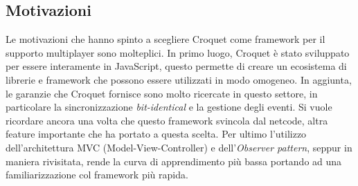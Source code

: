 \subsection{Motivazioni}\label{subsec:Croquet_motivazioni}
Le motivazioni che hanno spinto a scegliere Croquet come framework per il supporto multiplayer sono molteplici. In primo luogo, Croquet è stato sviluppato per essere interamente
in JavaScript, questo permette di creare un ecosistema di librerie e framework che possono essere utilizzati in modo omogeneo. In aggiunta, le garanzie che Croquet fornisce sono
molto ricercate in questo settore, in particolare la sincronizzazione \textit{bit-identical} e la gestione degli eventi. Si vuole ricordare ancora una volta che
questo framework svincola dal netcode, altra feature importante che ha portato a questa scelta. Per ultimo l'utilizzo dell'architettura MVC (Model-View-Controller) e 
dell'\textit{Observer pattern}, seppur in maniera rivisitata, rende la curva di apprendimento più bassa portando ad una familiarizzazione col framework più rapida.\\